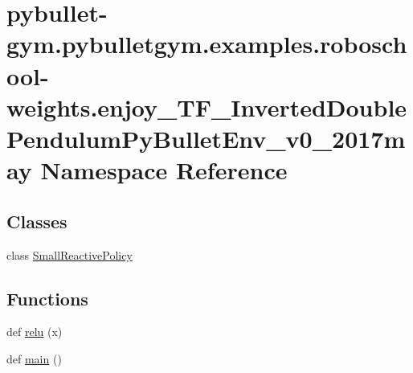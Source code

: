 \hypertarget{namespacepybullet-gym_1_1pybulletgym_1_1examples_1_1roboschool-weights_1_1enjoy___t_f___inverted4815cf8a7bea8454ae92c5ac92dac9b4}{}\section{pybullet-\/gym.pybulletgym.\+examples.\+roboschool-\/weights.enjoy\+\_\+\+T\+F\+\_\+\+Inverted\+Double\+Pendulum\+Py\+Bullet\+Env\+\_\+v0\+\_\+2017may Namespace Reference}
\label{namespacepybullet-gym_1_1pybulletgym_1_1examples_1_1roboschool-weights_1_1enjoy___t_f___inverted4815cf8a7bea8454ae92c5ac92dac9b4}
\subsection*{Classes}
\begin{DoxyCompactItemize}
\item 
class \hyperlink{classpybullet-gym_1_1pybulletgym_1_1examples_1_1roboschool-weights_1_1enjoy___t_f___inverted_doucbe7d8ea9a2e1866236207d9ffafbd53}{Small\+Reactive\+Policy}
\end{DoxyCompactItemize}
\subsection*{Functions}
\begin{DoxyCompactItemize}
\item 
def \hyperlink{namespacepybullet-gym_1_1pybulletgym_1_1examples_1_1roboschool-weights_1_1enjoy___t_f___inverted4815cf8a7bea8454ae92c5ac92dac9b4_a8ea4367482338e112720b12337483450}{relu} (x)
\item 
def \hyperlink{namespacepybullet-gym_1_1pybulletgym_1_1examples_1_1roboschool-weights_1_1enjoy___t_f___inverted4815cf8a7bea8454ae92c5ac92dac9b4_a2d0f93cf22e8519452c19cdad7a49ad5}{main} ()
\end{DoxyCompactItemize}

